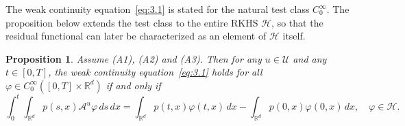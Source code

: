 \documentclass[11pt,leqno]{article}
\theoremstyle{plain}
\newtheorem{prop}{Proposition}
\theoremstyle{remark}
\theoremstyle{definition}
\numberwithin{equation}{section}
\numberwithin{figure}{section}
\numberwithin{table}{section}
\begin{document}
The weak continuity equation~\eqref{eq:3.1} is stated for the natural
test class $C_0^\infty$.  The proposition below extends the test class
to the entire RKHS $\mathcal{H}$, so that the residual functional can
later be characterized as an element of $\mathcal{H}$ itself.
\begin{prop}\label{prop:weak-eq}
Assume {\rm (A1)}, {\rm (A2)} and {\rm (A3)}.  Then for any
$u\in \mathcal{U}$ and any
$t\in[0,T]$, the weak continuity equation~\eqref{eq:3.1} holds for all
$\varphi\in C_0^{\infty}([0,T]\times\mathbb{R}^d)$ if and only if
\begin{equation}\label{eq:3.2}
\int_0^t\!\!\int_{\mathbb{R}^d}\!p(s,x)\mathcal{A}^u\varphi\,ds\,dx
 = \int_{\mathbb{R}^d}\!p(t,x)\varphi(t,x)\,dx
 - \int_{\mathbb{R}^d}\!p(0,x)\varphi(0,x)\,dx,
 \quad \varphi\in\mathcal{H}.
\end{equation}
\end{prop}
\end{document}
